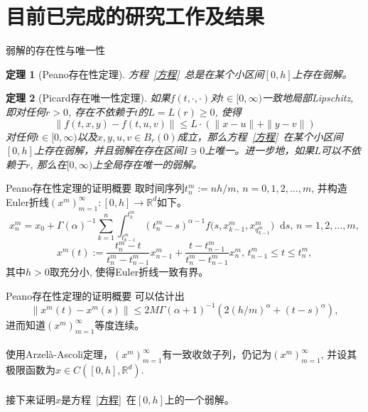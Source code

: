 \documentclass[aspectratio=16 9, 10pt, notheorems]{ctexbeamer}
\let\oldeqref\eqref
\renewcommand{\eqref}[1]{~\oldeqref{#1}~}
\newcommand{\mainEquation}{方程\eqref{方程}}
\newcommand{\differential}{\mathop{}\!\mathrm{d}}
\newcommand{\realset}{\mathbb{R}}
\newtheorem{theorem}{定理}
\begin{document}
\section{目前已完成的研究工作及结果}
\begin{frame}{弱解的存在性与唯一性}
    \begin{theorem}[Peano存在性定理]
        \mainEquation 总是在某个小区间$[0,h]$上存在弱解。
    \end{theorem}
    \begin{theorem}[Picard存在唯一性定理]
        如果$f(t,\cdot,\cdot)$对$t\in [0,\infty)$一致地局部Lipschitz, 即对任何$r>0$, 存在不依赖于$t$的$L=L(r)\geqslant 0$, 使得
        \begin{equation*}\label{Lipschitz}
            \| f(t,x,y) - f(t,u,v) \| \leqslant L\cdot (\|x-u\| + \|y-v\|)
        \end{equation*}
        对任何$t\in [0,\infty)$以及$x,y,u,v\in B_r(0)$成立，那么\mainEquation 在某个小区间$[0,h]$上存在弱解，并且弱解在存在区间$I\ni 0$上唯一。进一步地，如果$L$可以不依赖于$r$, 那么在$[0,\infty)$上全局存在唯一的弱解。
    \end{theorem}
\end{frame}
\begin{frame}{Peano存在性定理的证明概要}
    取时间序列$t^m_{n}:=nh/m,\,n=0,1,2,\dots,m$, 并构造Euler折线$\left(x^m\right)_{m=1}^\infty\colon[0,h]\to \realset^d$如下。
    \begin{equation*}
        x^m_{n}=x_0+\Gamma(\alpha)^{-1}\sum_{k=1}^n\int_{t^m_{k-1}}^{t^m_k}\left(t^m_n-s\right)^{\alpha-1}f\bigl(s,x^m_{k-1},x^m_{q^m_{k-1}}\bigr)\differential s,\,n=1,2,\dots,m,
    \end{equation*}
    \begin{equation*}
        x^m(t):=\frac{t^m_n-t}{t^m_n-t^m_{n-1}}x^m_{n-1}+\frac{t-t^m_{n-1}}{t^m_n-t^m_{n-1}}x^m_{n},\,t^m_{n-1}\leqslant t\leqslant t^m_n,
    \end{equation*}
    其中$h>0$取充分小, 使得Euler折线一致有界。
\end{frame}
\begin{frame}{Peano存在性定理的证明概要}
    可以估计出
    \begin{equation*}\label{xmts}
        \left\| x^m(t)-x^m(s) \right\| \leqslant 2M\Gamma(\alpha+1)^{-1}\left(2(h/m)^\alpha+(t-s)^\alpha\right),
    \end{equation*}
    进而知道$\left(x^m\right)_{m=1}^\infty$等度连续。
    \\~\\
    使用Arzel\`a-Ascoli定理，$\left(x^m\right)_{m=1}^\infty$有一致收敛子列，仍记为$\left(x^m\right)_{m=1}^\infty$, 并设其极限函数为$x\in C\left([0,h],\realset^d\right)$.
    \\~\\
    接下来证明$x$是\mainEquation 在$[0,h]$上的一个弱解。
\end{frame}
\end{document}
